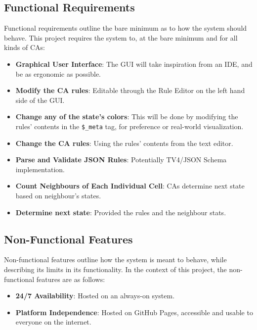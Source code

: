 \subsection{Functional Requirements}
Functional requirements outline the bare minimum as to how the system should behave. This project requires the system to, at the bare minimum and for all kinds of CAs:
\begin{itemize}
    \item \textbf{Graphical User Interface}: The GUI will take inspiration from an IDE, and be as ergonomic as possible.
    \item \textbf{Modify the CA rules}: Editable through the Rule Editor on the left hand side of the GUI. 
    \item \textbf{Change any of the state's colors}: This will be done by modifying the rules' contents in the \texttt{\$\_meta} tag, for preference or real-world visualization.
    \item \textbf{Change the CA rules}: Using the rules' contents from the text editor. 
    \item \textbf{Parse and Validate JSON Rules}: Potentially TV4/JSON Schema implementation.
    \item \textbf{Count Neighbours of Each Individual Cell}: CAs determine next state based on neighbour's states. 
    \item \textbf{Determine next state}: Provided the rules and the neighbour stats. 
\end{itemize}

\subsection{Non-Functional Features}
Non-functional features outline how the system is meant to behave, while describing its limits in its functionality. In the context of this project, the non-functional features are as follows:
\begin{itemize}
    \item \textbf{24/7 Availability}: Hosted on an always-on system.
    \item \textbf{Platform Independence}: Hosted on GitHub Pages, accessible and usable to everyone on the internet.
\end{itemize}

